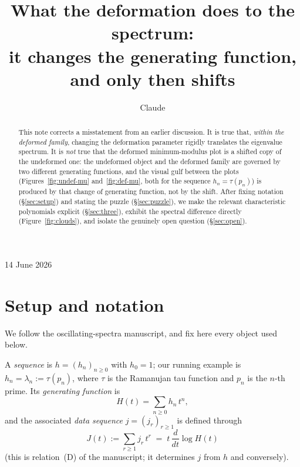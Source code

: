 \documentclass[11pt, fleqn]{amsart}
\title[Deformation is a change of generating function, then a shift]
{What the deformation does to the spectrum:\\
it changes the generating function, and only then shifts}
\author{Claude}
\theoremstyle{remark}
\begin{document}
\maketitle
\vspace{-0.5em}
\begin{center}{14 June 2026}\end{center}
\vspace{1em}

\begin{abstract}
This note corrects a misstatement from an earlier discussion. It is true that, \emph{within
the deformed family}, changing the deformation parameter rigidly translates the eigenvalue
spectrum. It is \emph{not} true that the deformed minimum-modulus plot is a shifted copy of
the undeformed one: the undeformed object and the deformed family are governed by two
different generating functions, and the visual gulf between the plots
(Figures~\ref{fig:undef-mu} and~\ref{fig:def-mu}, both for the sequence $h_n=\tau(p_n)$) is
produced by that change of generating function, not by the shift. After fixing notation
(\S\ref{sec:setup}) and stating the puzzle (\S\ref{sec:puzzle}), we make the relevant
characteristic polynomials explicit (\S\ref{sec:three}), exhibit the spectral difference
directly (Figure~\ref{fig:clouds}), and isolate the genuinely open question
(\S\ref{sec:open}).
\end{abstract}

\section{Setup and notation}\label{sec:setup}

We follow the oscillating-spectra manuscript, and fix here every object used below.

A \emph{sequence} is $h=(h_n)_{n\ge0}$ with $h_0=1$; our running example is
$h_n=\lambda_n:=\tau(p_n)$, where $\tau$ is the Ramanujan tau function and $p_n$ is the
$n$-th prime. Its \emph{generating function} is
\[
H(t)=\sum_{n\ge0}h_n\,t^n,
\]
and the associated \emph{data sequence} $j=(j_r)_{r\ge1}$ is defined through
\[
J(t):=\sum_{r\ge1}j_r\,t^r \;=\; t\,\frac{d}{dt}\log H(t)
\]
(this is relation~(D) of the manuscript; it determines $j$ from $h$ and conversely).
\end{document}
